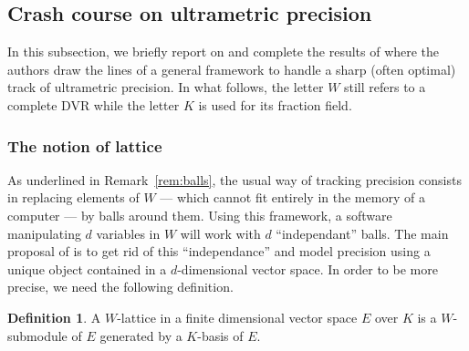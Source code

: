 \documentclass{jT}
\numberwithin{equation}{section}
\theoremstyle{definition}
\newtheorem{deftn}[theo]{Definition}
\newcommand{\A}{W}
\begin{document}
\subsection{Crash course on ultrametric precision}
\label{subsec:crashcourse}

In this subsection, we briefly report on and complete the results of 
\cite{padicprec} where the authors draw the lines of a general framework 
to handle a sharp (often optimal) track of ultrametric precision. In 
what follows, the letter $W$ still refers to a complete DVR while the 
letter $K$ is used for its fraction field.

\subsubsection{The notion of lattice}

As underlined in Remark~\ref{rem:balls}, the usual way of tracking 
precision consists in replacing elements of $\A$ --- which cannot fit 
entirely in the memory of a computer --- by balls around them. Using 
this framework, a software manipulating $d$ variables in $\A$ will work 
with $d$ ``independant'' balls. The main proposal of \cite{padicprec} is 
to get rid of this ``independance'' and model precision using a unique
object contained in a $d$-dimensional vector space. In order to be more
precise, we need the following definition.

\begin{deftn}
A $\A$-lattice in a finite dimensional vector space $E$ over $K$ is
a $\A$-submodule of $E$ generated by a $K$-basis of $E$.
\end{deftn}
\end{document}
